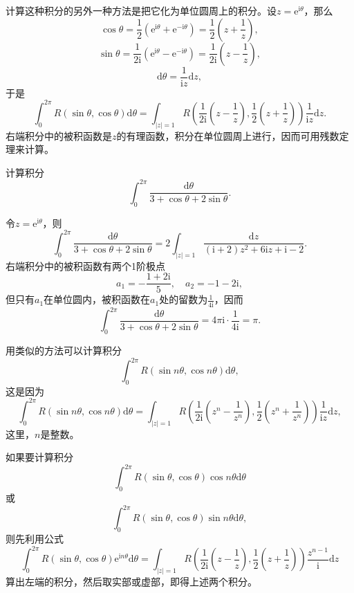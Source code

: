 \documentclass[../../main.tex]{subfiles}
\begin{document}
计算这种积分的另外一种方法是把它化为单位圆周上的积分。设\( z = \mathrm{e}^{\mathrm{i}\theta} \)，那么
\[
\cos\theta = \frac{1}{2} (\mathrm{e}^{\mathrm{i}\theta} + \mathrm{e}^{-\mathrm{i}\theta}) = \frac{1}{2} \left( z + \frac{1}{z} \right),
\]
\[
\sin\theta = \frac{1}{2\mathrm{i}} (\mathrm{e}^{\mathrm{i}\theta} - \mathrm{e}^{-\mathrm{i}\theta}) = \frac{1}{2\mathrm{i}} \left( z - \frac{1}{z} \right),
\]
\[
\mathrm{d}\theta = \frac{1}{\mathrm{i}z} \mathrm{d}z,
\]
于是
\[
\int_{0}^{2\pi} R(\sin\theta, \cos\theta) \mathrm{d}\theta = \int_{|z| = 1} R\left( \frac{1}{2\mathrm{i}} \left( z - \frac{1}{z} \right), \frac{1}{2} \left( z + \frac{1}{z} \right) \right) \frac{1}{\mathrm{i}z} \mathrm{d}z.
\]
右端积分中的被积函数是\( z \)的有理函数，积分在单位圆周上进行，因而可用残数定理来计算。

\begin{example}
计算积分
\[
\int_{0}^{2\pi} \frac{\mathrm{d}\theta}{3 + \cos\theta + 2\sin\theta}.
\]
\end{example}
\begin{solution}
令\( z = \mathrm{e}^{\mathrm{i}\theta} \)，则
\[
\int_{0}^{2\pi} \frac{\mathrm{d}\theta}{3 + \cos\theta + 2\sin\theta} = 2 \int_{|z| = 1} \frac{\mathrm{d}z}{(\mathrm{i} + 2)z^2 + 6\mathrm{i}z + \mathrm{i} - 2}.
\]
右端积分中的被积函数有两个1阶极点
\[
a_1 = -\frac{1 + 2\mathrm{i}}{5}, \quad a_2 = -1 - 2\mathrm{i},
\]
但只有\( a_1 \)在单位圆内，被积函数在\( a_1 \)处的留数为\( \frac{1}{4\mathrm{i}} \)，因而
\[
\int_{0}^{2\pi} \frac{\mathrm{d}\theta}{3 + \cos\theta + 2\sin\theta} = 4\pi \mathrm{i} \cdot \frac{1}{4\mathrm{i}}
= \pi.
\]
\end{solution}

用类似的方法可以计算积分
\[
\int_{0}^{2\pi} R(\sin n\theta, \cos n\theta) \mathrm{d}\theta,
\]
这是因为
\[
\int_{0}^{2\pi} R(\sin n\theta, \cos n\theta) \mathrm{d}\theta = \int_{|z| = 1} R\left( \frac{1}{2\mathrm{i}} \left( z^n - \frac{1}{z^n} \right), \frac{1}{2} \left( z^n + \frac{1}{z^n} \right) \right) \frac{1}{\mathrm{i}z} \mathrm{d}z,
\]
这里，\( n \)是整数。

如果要计算积分
\[
\int_{0}^{2\pi} R(\sin\theta, \cos\theta) \cos n\theta \mathrm{d}\theta
\]
或
\[
\int_{0}^{2\pi} R(\sin\theta, \cos\theta) \sin n\theta \mathrm{d}\theta,
\]
则先利用公式
\[
\int_{0}^{2\pi} R(\sin\theta, \cos\theta) \mathrm{e}^{\mathrm{i}n\theta} \mathrm{d}\theta = \int_{|z| = 1} R\left( \frac{1}{2\mathrm{i}} \left( z - \frac{1}{z} \right), \frac{1}{2} \left( z + \frac{1}{z} \right) \right) \frac{z^{n - 1}}{\mathrm{i}} \mathrm{d}z \label{formula10}
\]
算出左端的积分，然后取实部或虚部，即得上述两个积分。
\end{document}
